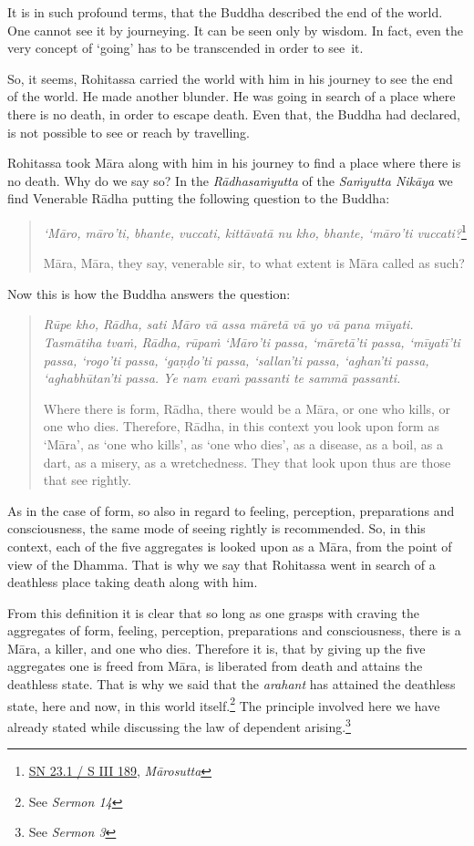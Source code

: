 It is in such profound terms, that the Buddha described the end of the world. One cannot see it by journeying. It can be seen only by wisdom. In fact, even the very concept of `going' has to be transcended in order to see~it.

So, it seems, Rohitassa carried the world with him in his journey to see the end of the world. He made another blunder. He was going in search of a place where there is no death, in order to escape death. Even that, the Buddha had declared, is not possible to see or reach by travelling.

Rohitassa took Māra along with him in his journey to find a place where there is no death. Why do we say so? In the \emph{Rādhasaṁyutta} of the \emph{Saṁyutta Nikāya} we find Venerable Rādha putting the following question to the Buddha:

\begin{quote}
\emph{`Māro, māro'ti, bhante, vuccati, kittāvatā nu kho, bhante, `māro'ti vuccati?}\footnote{\href{https://suttacentral.net/sn23.1/pli/ms}{SN 23.1 / S III 189}, \emph{Mārosutta}}

Māra, Māra, they say, venerable sir, to what extent is Māra called as such?
\end{quote}

Now this is how the Buddha answers the question:

\begin{quote}
\emph{Rūpe kho, Rādha, sati Māro vā assa māretā vā yo vā pana mīyati. Tasmātiha tvaṁ, Rādha, rūpaṁ `Māro'ti passa, `māretā'ti passa, `mīyatī'ti passa, `rogo'ti passa, `gaṇḍo'ti passa, `sallan'ti passa, `aghan'ti passa, `aghabhūtan'ti passa. Ye nam evaṁ passanti te sammā passanti.}

Where there is form, Rādha, there would be a Māra, or one who kills, or one who dies. Therefore, Rādha, in this context you look upon form as `Māra', as `one who kills', as `one who dies', as a disease, as a boil, as a dart, as a misery, as a wretchedness. They that look upon thus are those that see rightly.
\end{quote}

As in the case of form, so also in regard to feeling, perception, preparations and consciousness, the same mode of seeing rightly is recommended. So, in this context, each of the five aggregates is looked upon as a Māra, from the point of view of the Dhamma. That is why we say that Rohitassa went in search of a deathless place taking death along with him.

From this definition it is clear that so long as one grasps with craving the aggregates of form, feeling, perception, preparations and consciousness, there is a Māra, a killer, and one who dies. Therefore it is, that by giving up the five aggregates one is freed from Māra, is liberated from death and attains the deathless state. That is why we said that the \emph{arahant} has attained the deathless state, here and now, in this world itself.\footnote{See \emph{Sermon 14}} The principle involved here we have already stated while discussing the law of dependent arising.\footnote{See \emph{Sermon 3}}

